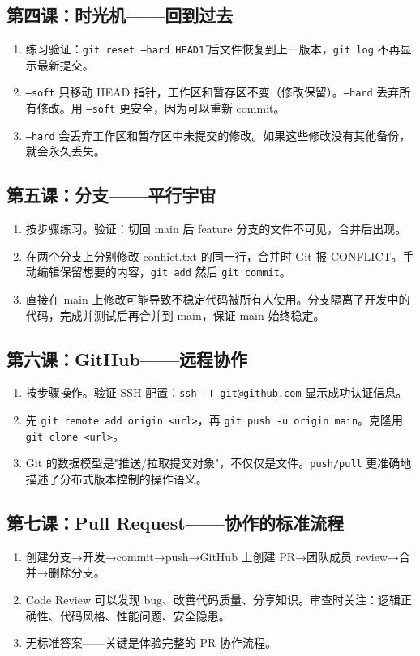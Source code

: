 \documentclass[a4paper,12pt]{ctexart}
\begin{document}
\subsection*{第四课：时光机——回到过去}
\begin{enumerate}
  \item 练习验证：\texttt{git reset --hard HEAD\~1} 后文件恢复到上一版本，\texttt{git log} 不再显示最新提交。
  \item \texttt{--soft} 只移动 HEAD 指针，工作区和暂存区不变（修改保留）。\texttt{--hard} 丢弃所有修改。用 \texttt{--soft} 更安全，因为可以重新 commit。
  \item \texttt{--hard} 会丢弃工作区和暂存区中未提交的修改。如果这些修改没有其他备份，就会永久丢失。
\end{enumerate}

\subsection*{第五课：分支——平行宇宙}
\begin{enumerate}
  \item 按步骤练习。验证：切回 main 后 feature 分支的文件不可见，合并后出现。
  \item 在两个分支上分别修改 conflict.txt 的同一行，合并时 Git 报 CONFLICT。手动编辑保留想要的内容，\texttt{git add} 然后 \texttt{git commit}。
  \item 直接在 main 上修改可能导致不稳定代码被所有人使用。分支隔离了开发中的代码，完成并测试后再合并到 main，保证 main 始终稳定。
\end{enumerate}

\subsection*{第六课：GitHub——远程协作}
\begin{enumerate}
  \item 按步骤操作。验证 SSH 配置：\texttt{ssh -T git@github.com} 显示成功认证信息。
  \item 先 \texttt{git remote add origin <url>}，再 \texttt{git push -u origin main}。克隆用 \texttt{git clone <url>}。
  \item Git 的数据模型是"推送/拉取提交对象"，不仅仅是文件。\texttt{push/pull} 更准确地描述了分布式版本控制的操作语义。
\end{enumerate}

\subsection*{第七课：Pull Request——协作的标准流程}
\begin{enumerate}
  \item 创建分支→开发→commit→push→GitHub 上创建 PR→团队成员 review→合并→删除分支。
  \item Code Review 可以发现 bug、改善代码质量、分享知识。审查时关注：逻辑正确性、代码风格、性能问题、安全隐患。
  \item 无标准答案——关键是体验完整的 PR 协作流程。
\end{enumerate}
\end{document}
